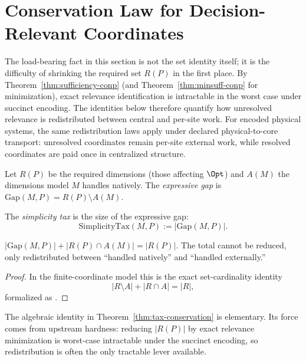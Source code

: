 \section{Conservation Law for Decision-Relevant Coordinates}\label{sec:simplicity-tax}

The load-bearing fact in this section is not the set identity itself; it is the difficulty of shrinking the required set $R(P)$ in the first place. By Theorem~\ref{thm:sufficiency-conp} (and Theorem~\ref{thm:minsuff-conp} for minimization), exact relevance identification is intractable in the worst case under succinct encoding. The identities below therefore quantify how unresolved relevance is redistributed between central and per-site work.
For encoded physical systems, the same redistribution laws apply under declared physical-to-core transport: unresolved coordinates remain per-site external work, while resolved coordinates are paid once in centralized structure.

\begin{definition}
Let $R(P)$ be the required dimensions (those affecting $\Opt$) and $A(M)$ the dimensions model $M$ handles natively. The \emph{expressive gap} is $\text{Gap}(M,P) = R(P) \setminus A(M)$.
\end{definition}

\begin{definition}\label{def:simplicity-tax}
The \emph{simplicity tax} is the size of the expressive gap:
\[
\text{SimplicityTax}(M,P) := |\text{Gap}(M,P)|.
\]
\end{definition}

\begin{theorem}\label{thm:tax-conservation}
$|\text{Gap}(M, P)| + |R(P) \cap A(M)| = |R(P)|$. The total cannot be reduced, only redistributed between ``handled natively'' and ``handled externally.''
\end{theorem}

\begin{proof}
In the finite-coordinate model this is the exact set-cardinality identity
\[
|R\setminus A| + |R\cap A| = |R|,
\]
formalized as .
\end{proof}

\begin{remark}
The algebraic identity in Theorem~\ref{thm:tax-conservation} is elementary. Its force comes from upstream hardness: reducing $|R(P)|$ by exact relevance minimization is worst-case intractable under the succinct encoding, so redistribution is often the only tractable lever available.
\end{remark}

